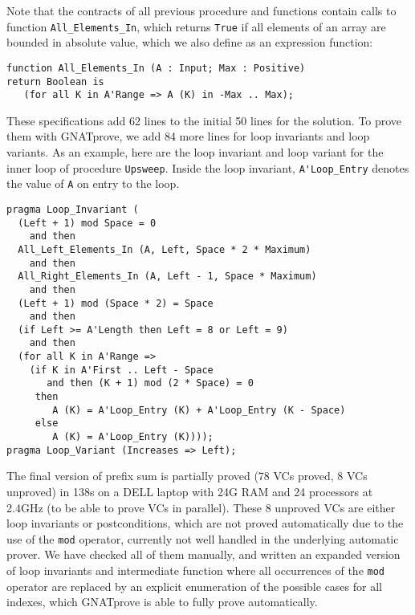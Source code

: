\documentclass[sttt,draft]{svjour}
\newcommand{\gnatprove}{GNATprove\xspace}
\begin{document}
Note that the contracts of all previous procedure and functions contain calls
to function \verb|All_Elements_In|, which returns \verb|True| if all elements
of an array are bounded in absolute value, which we also define as an
expression function:

\begin{footnotesize}
\begin{verbatim}
function All_Elements_In (A : Input; Max : Positive)
return Boolean is
   (for all K in A'Range => A (K) in -Max .. Max);
\end{verbatim}
\end{footnotesize}

These specifications add 62 lines to the initial 50 lines for the solution. To
prove them with \gnatprove, we add 84 more lines for loop invariants and loop
variants. As an example, here are the loop invariant and loop variant for the
inner loop of procedure \verb|Upsweep|. Inside the loop invariant,
\verb|A'Loop_Entry| denotes the value of \verb|A| on entry to the loop.

\begin{footnotesize}
\begin{verbatim}
pragma Loop_Invariant (
  (Left + 1) mod Space = 0
    and then
  All_Left_Elements_In (A, Left, Space * 2 * Maximum)
    and then
  All_Right_Elements_In (A, Left - 1, Space * Maximum)
    and then
  (Left + 1) mod (Space * 2) = Space
    and then
  (if Left >= A'Length then Left = 8 or Left = 9)
    and then
  (for all K in A'Range =>
    (if K in A'First .. Left - Space
       and then (K + 1) mod (2 * Space) = 0
     then
        A (K) = A'Loop_Entry (K) + A'Loop_Entry (K - Space)
     else
        A (K) = A'Loop_Entry (K))));
pragma Loop_Variant (Increases => Left);
\end{verbatim}
\end{footnotesize}

The final version of prefix sum is partially proved (78 VCs proved, 8 VCs
unproved) in 138s on a DELL laptop with 24G RAM and 24 processors at 2.4GHz (to
be able to prove VCs in parallel).  These 8 unproved VCs are either loop
invariants or postconditions, which are not proved automatically due to the use
of the \verb|mod| operator, currently not well handled in the underlying
automatic prover. We have checked all of them manually, and written an expanded
version of loop invariants and intermediate function where all occurrences of
the \verb|mod| operator are replaced by an explicit enumeration of the possible
cases for all indexes, which \gnatprove is able to fully prove automatically.
\end{document}
